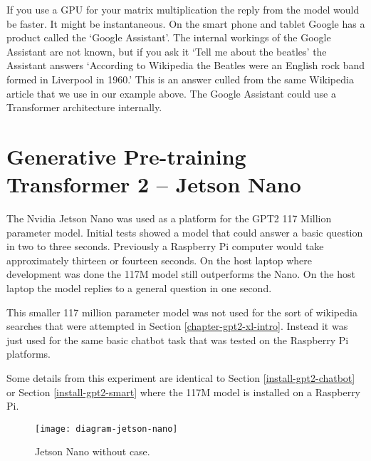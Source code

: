 If you use a GPU for your matrix multiplication the reply from the model would be faster. It might be instantaneous. On the smart phone and tablet Google has a product called the `Google Assistant'. The internal workings of the Google Assistant are not known, but if you ask it `Tell me about the beatles' the Assistant answers `According to Wikipedia the Beatles were an English rock band formed in Liverpool in 1960.' This is an answer culled from the same Wikipedia article that we use in our example above. The Google Assistant could use a Transformer architecture internally.

\label{chapter-xlarge}

\section{Generative Pre-training Transformer 2 -- Jetson Nano}

The Nvidia Jetson Nano was used as a platform for the GPT2 117 Million parameter model. Initial tests showed a model that could answer a basic question in two to three seconds. Previously a Raspberry Pi computer would take approximately thirteen or fourteen seconds. On the host laptop where development was done the 117M model still outperforms the Nano. On the host laptop the model replies to a general question in one second.

This smaller 117 million parameter model was not used for the sort of wikipedia searches that were attempted in Section \ref{chapter-gpt2-xl-intro}. Instead it was just used for the same basic chatbot task that was tested on the Raspberry Pi platforms.

Some details from this experiment are identical to Section \ref{install-gpt2-chatbot} or Section \ref{install-gpt2-smart} where the 117M model is installed on a Raspberry Pi.

\begin{figure}[H]
	\begin{center}
		\texttt{[image: diagram-jetson-nano]}
		
		
	\end{center}
	\caption[Jetson Nano]{Jetson Nano without case.}
	
	
\end{figure}